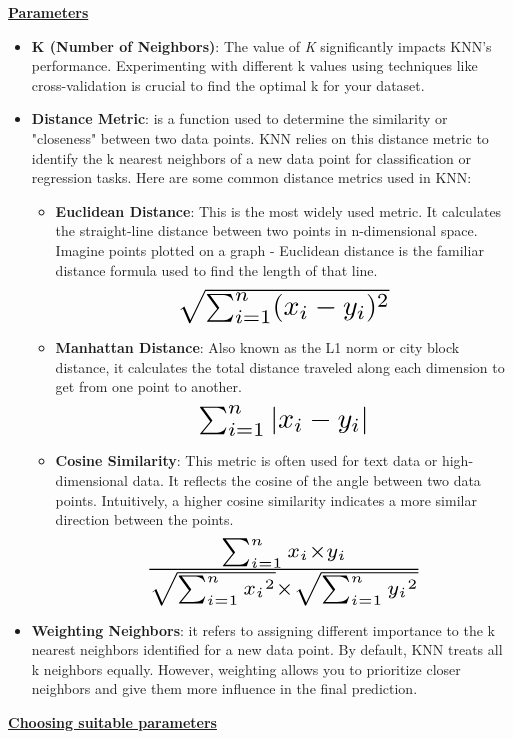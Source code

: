 \documentclass[a4paper]{report}
\begin{document}
	\underline{\textbf{\Large{Parameters}}}
	\begin{itemize}
		\item \textbf{K (Number of Neighbors)}: The value of \textit{K} significantly impacts KNN's performance. Experimenting with different k values using techniques like cross-validation is crucial to find the optimal k for your dataset.
		\item \textbf{Distance Metric}: is a function used to determine the similarity or "closeness" between two data points. KNN relies on this distance metric to identify the k nearest neighbors of a new data point for classification or regression tasks. Here are some common distance metrics used in KNN:\begin{itemize}
			\item \textbf{Euclidean Distance}: This is the most widely used metric. It calculates the straight-line distance between two points in n-dimensional space. Imagine points plotted on a graph - Euclidean distance is the familiar distance formula used to find the length of that line.
			\[
			\scalebox{2.0}{$\sqrt{\sum_{i=1}^{n}(\mathnormal{x}_i  - \mathnormal{y}_i)^2}$}
			\]
			\item \textbf{Manhattan Distance}: Also known as the L1 norm or city block distance, it calculates the total distance traveled along each dimension to get from one point to another.
			\[
			\scalebox{2.0}{$\sum_{i=1}^{n} | \mathnormal{x}_i - \mathnormal{y}_i |$}
			\]
			\item \textbf{Cosine Similarity}: This metric is often used for text data or high-dimensional data. It reflects the cosine of the angle between two data points. Intuitively, a higher cosine similarity indicates a more similar direction between the points.
			\[
			\scalebox{2.0}{$\frac{\sum_{i=1}^{n}\mathnormal{x}_i \times \mathnormal{y}_i }{ \sqrt{\sum_{i=1}^{n}{\mathnormal{x}_i}^2}  \times \sqrt{\sum_{i=1}^{n}{\mathnormal{y}_i}^2}}$}
			\]
		\end{itemize}
		\item \textbf{Weighting Neighbors}: it refers to assigning different importance to the k nearest neighbors identified for a new data point. By default, KNN treats all k neighbors equally. However, weighting allows you to prioritize closer neighbors and give them more influence in the final prediction.
	\end{itemize}
	\pagebreak
	
	\underline{\textbf{\Large{Choosing suitable parameters}}}
	
\end{document}
